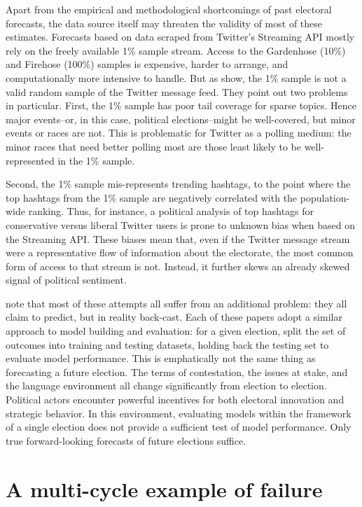 \documentclass{article}
\begin{document}
Apart from the empirical and methodological shortcomings of past
electoral forecasts, the data source itself may threaten the validity
of most of these estimates. Forecasts based on data scraped from
Twitter's Streaming API mostly rely on the freely available 1\% sample
stream. Access to the Gardenhose (10\%) and Firehose (100\%) samples
is expensive, harder to arrange, and computationally more intensive to
handle. But as \cite{morstatter2013sample} show, the 1\% sample is not
a valid random sample of the Twitter message feed. They point out two
problems in particular. First, the 1\% sample has poor tail coverage
for sparse topics. Hence major events--or, in this case, political
elections--might be well-covered, but minor events or races are
not. This is problematic for Twitter as a polling medium: the minor
races that need better polling most are those least likely to be
well-represented in the 1\% sample. 

Second, the 1\% sample mis-represents trending hashtags, to the point
where the top hashtags from the 1\% sample are negatively correlated
with the population-wide ranking. Thus, for instance, a political
analysis of top hashtags for conservative versus liberal Twitter users
is prone to unknown bias when based on the Streaming API. These biases
mean that, even if the Twitter message stream were a representative
flow of information about the electorate, the most common form of
access to that stream is not. Instead, it further skews an already
skewed signal of political sentiment.

\cite{metaxas2011not} note that most of these attempts all suffer from
an additional problem: they all claim to predict, but in reality
back-cast. Each of these papers adopt a similar approach to model
building and evaluation: for a given election, split the set of
outcomes into training and testing datasets, holding back the testing
set to evaluate model performance. This is emphatically not the same
thing as forecasting a future election. The terms of contestation, the
issues at stake, and the language environment all change significantly
from election to election. Political actors encounter powerful
incentives for both electoral innovation and strategic behavior. In
this environment, evaluating models within the framework of a single
election does not provide a sufficient test of model performance. Only
true forward-looking forecasts of future elections suffice.


\section{A multi-cycle example of failure}
\label{sec:multi-cycle-example}
\end{document}
